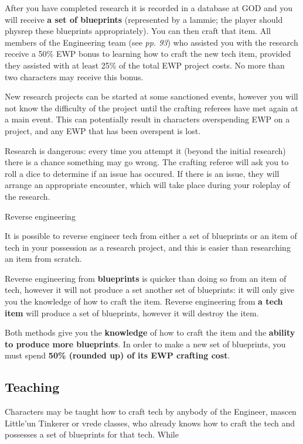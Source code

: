 \documentclass{scrbook}
\begin{document}
After you have completed research it is recorded in a database at GOD and you will receive \textbf{a set of blueprints} (represented by a lammie; the player should physrep these blueprints appropriately). You can then craft that item. All members of the Engineering team (see \textit{pp. 93}) who assisted you with the research receive a 50\% EWP bonus to learning how to craft the new tech item, provided they assisted with at least 25\% of the total EWP project costs. No more than two characters may receive this bonus.

New research projects can be started at some sanctioned events, however you will not know the difficulty of the project until the crafting referees have met again at a main event. This can potentially result in characters overspending EWP on a project, and any EWP that has been overspent is lost.

Research is dangerous: every time you attempt it (beyond the initial research) there is a chance something may go wrong. The crafting referee will ask you to roll a dice to determine if an issue has occured. If there is an issue, they will arrange an appropriate encounter, which will take place during your roleplay of the research.

Reverse engineering

It is possible to reverse engineer tech from either a set of blueprints or an item of tech in your possession as a research project, and this is easier than researching an item from scratch.

Reverse engineering from \textbf{blueprints} is quicker than doing so from an item of tech, however it will not produce a set another set of blueprints: it will only give you the knowledge of how to craft the item. Reverse engineering from \textbf{a tech item} will produce a set of blueprints, however it will destroy the item.

Both methods give you the \textbf{knowledge} of how to craft the item and the \textbf{ability to produce more blueprints}. In order to make a new set of blueprints, you must spend \textbf{50\% (rounded up) of its EWP crafting cost}.

    \subsection{Teaching}

Characters may be taught how to craft tech by anybody of the Engineer, mascen Little'un Tinkerer or vrede classes, who already knows how to craft the tech and possesses a set of blueprints for that tech. While
\end{document}
